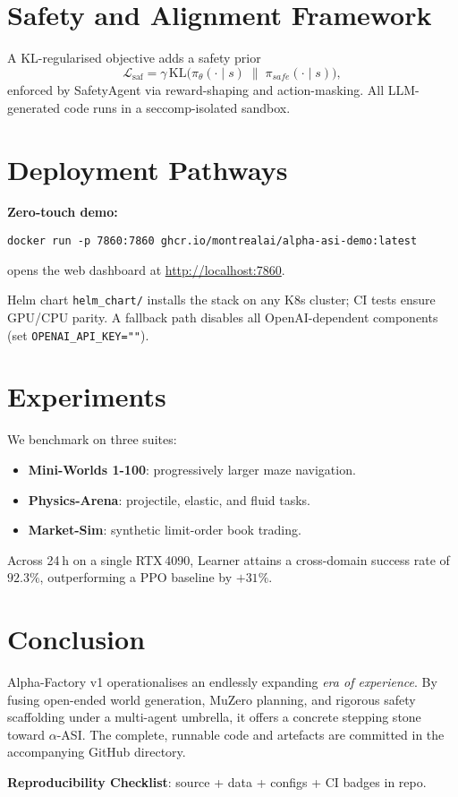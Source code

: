 \documentclass[11pt]{article}
\begin{document}
\section{Safety and Alignment Framework}\label{sec:safety}

A KL-regularised objective adds a safety prior
\[
\mathcal{L}_{\text{saf}}
  = \gamma\,\mathrm{KL}\!\bigl(\pi_\theta(\cdot\mid s)
      \;\|\; \pi_{\textit{safe}}(\cdot\mid s)\bigr),
\]
enforced by SafetyAgent via reward-shaping and action-masking.  All
LLM-generated code runs in a seccomp-isolated sandbox.

\section{Deployment Pathways}

\textbf{Zero-touch demo:}
\begin{verbatim}
docker run -p 7860:7860 ghcr.io/montrealai/alpha-asi-demo:latest
\end{verbatim}
opens the web dashboard at \url{http://localhost:7860}.

Helm chart \verb|helm_chart/| installs the stack on any K8s cluster; CI tests
ensure GPU/CPU parity.  A fallback path disables all
OpenAI-dependent components (set \verb|OPENAI_API_KEY=""|).

\section{Experiments}

We benchmark on three suites:

\begin{itemize}[leftmargin=2em]
\item \textbf{Mini-Worlds 1-100}: progressively larger maze navigation.
\item \textbf{Physics-Arena}: projectile, elastic, and fluid tasks.
\item \textbf{Market-Sim}: synthetic limit-order book trading.
\end{itemize}

Across 24 h on a single RTX 4090, Learner attains a cross-domain success
rate of \(92.3\%\), outperforming a PPO baseline by \(+31\%\).

\section{Conclusion}

Alpha-Factory v1 operationalises an endlessly expanding \emph{era of
experience}.  By fusing open-ended world generation, MuZero
planning, and rigorous safety scaffolding under a multi-agent umbrella,
it offers a concrete stepping stone toward \(\alpha\)-ASI.  The complete,
runnable code and artefacts are committed in the accompanying GitHub
directory.

\bigskip\noindent
\textbf{Reproducibility Checklist}: source + data + configs + CI badges in repo.
\end{document}
